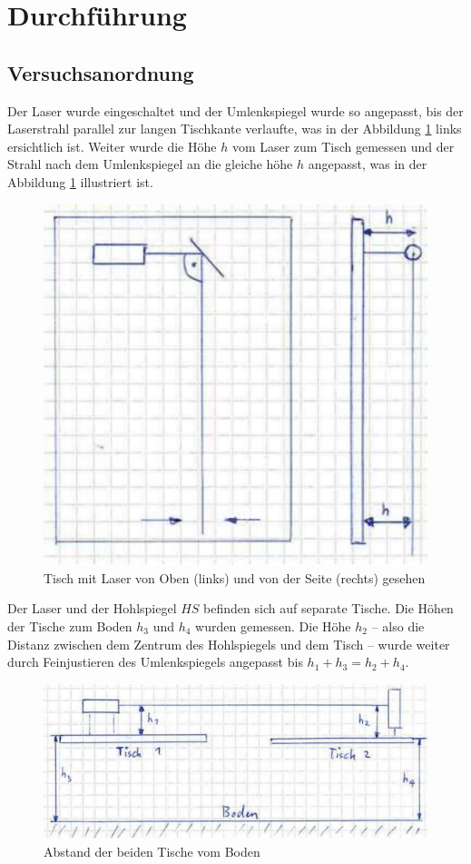 \section{Durchf\"uhrung}

\subsection{Versuchsanordnung}

Der Laser  wurde eingeschaltet und  der Umlenkspiegel wurde so  angepasst, bis
der Laserstrahl parallel zur langen Tischkante verlaufte, was in der Abbildung
\ref{fig:laser-angle} links  ersichtlich ist. Weiter wurde die  H\"ohe $h$ vom
Laser zum Tisch gemessen und der  Strahl nach dem Umlenkspiegel an die gleiche
h\"ohe $h$  angepasst, was in der  Abbildung \ref{fig:laser-angle} illustriert
ist.

\begin{figure}[H]
    \center
    \includegraphics[width=.5\textwidth]{images/laser-angle.pdf}
    \caption{Tisch mit Laser von Oben (links) und von der Seite (rechts) gesehen}
    \label{fig:laser-angle}
\end{figure}

Der  Laser und  der Hohlspiegel  $HS$  befinden sich  auf separate  Tische. Die
H\"ohen der Tische zum Boden $h_3$ und $h_4$ wurden gemessen. Die H\"ohe $h_2$
-- also  die Distanz  zwischen dem  Zentrum des Hohlspiegels  und dem  Tisch --
wurde weiter durch  Feinjustieren des Umlenkspiegels angepasst  bis $h_1+h_3 =
h_2+h_4$.

\begin{figure}[H]
    \center
    \includegraphics[width=.8\textwidth]{images/laser-height.pdf}
    \caption{Abstand der beiden Tische vom Boden}
    \label{fig:laser-height}
\end{figure}

